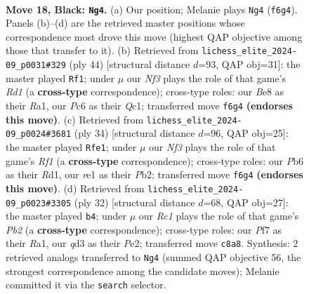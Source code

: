 \documentclass[11pt]{article}
\begin{document}
\clearpage

\begin{figure}[p]\centering
\begin{subfigure}{0.46\textwidth}\centering
\resizebox{\linewidth}{!}{%
\newchessgame
\chessboard[
  setfen={2r1b1k1/p1qr1pp1/npp1pn2/7p/PbNP1P2/1PNQ2P1/4P2P/R1B1RBK1 b - - 7 18},
  showmover=false,
  pgfstyle=straightmove, color=movearrow, markmove={f6-g4}
]}
\caption{}
\end{subfigure}\hfill
\begin{subfigure}{0.46\textwidth}\centering
\resizebox{\linewidth}{!}{%
\newchessgame
\chessboard[
  setfen={2r3k1/1p2q1bp/n1pr1p2/p1n2Pp1/3N4/1P2p1P1/PBP1P1BP/R1QR3K w - - 2 23},
  showmover=false,
  pgfstyle=straightmove, color=movearrow, markmove={d1-f1}
]}
\caption{}
\end{subfigure}
\\[4pt]
\begin{subfigure}{0.46\textwidth}\centering
\resizebox{\linewidth}{!}{%
\newchessgame
\chessboard[
  setfen={r1bqr1k1/1p3ppp/2pp1b2/p3n3/Pn1NPB2/1BN4P/1PP2PPQ/3R1RK1 w - - 10 18},
  showmover=false,
  pgfstyle=straightmove, color=movearrow, markmove={f1-e1}
]}
\caption{}
\end{subfigure}\hfill
\begin{subfigure}{0.46\textwidth}\centering
\resizebox{\linewidth}{!}{%
\newchessgame
\chessboard[
  setfen={r1b1r1k1/1pq2pbp/p2p2p1/2pPn3/P3NB2/6P1/1P1QPPBP/R1R3K1 w - - 4 17},
  showmover=false,
  pgfstyle=straightmove, color=movearrow, markmove={b2-b4}
]}
\caption{}
\end{subfigure}
\caption{\textbf{Move 18, Black: \texttt{Ng4}.} (a) Our position; Melanie plays \texttt{Ng4} (\texttt{f6g4}). Panels (b)--(d) are the retrieved master positions whose correspondence most drove this move (highest QAP objective among those that transfer to it). (b) Retrieved from \texttt{lichess\_elite\_2024-09\_p0031\#329} (ply 44) [structural distance $d$=93, QAP obj=31]: the master played \texttt{Rf1}; under $\mu$ our \emph{Nf3} plays the role of that game's \emph{Rd1} (a \textbf{cross-type} correspondence); cross-type roles: our \emph{B}e8 as their \emph{R}a1, our \emph{P}c6 as their \emph{Q}c1; transferred move \texttt{f6g4} \textbf{(endorses this move)}. (c) Retrieved from \texttt{lichess\_elite\_2024-09\_p0024\#3681} (ply 34) [structural distance $d$=96, QAP obj=25]: the master played \texttt{Rfe1}; under $\mu$ our \emph{Nf3} plays the role of that game's \emph{Rf1} (a \textbf{cross-type} correspondence); cross-type roles: our \emph{P}b6 as their \emph{R}d1, our \emph{r}e1 as their \emph{P}b2; transferred move \texttt{f6g4} \textbf{(endorses this move)}. (d) Retrieved from \texttt{lichess\_elite\_2024-09\_p0023\#3305} (ply 32) [structural distance $d$=68, QAP obj=27]: the master played \texttt{b4}; under $\mu$ our \emph{Rc1} plays the role of that game's \emph{Pb2} (a \textbf{cross-type} correspondence); cross-type roles: our \emph{P}f7 as their \emph{R}a1, our \emph{q}d3 as their \emph{P}e2; transferred move \texttt{c8a8}. Synthesis: 2 retrieved analogs transferred to \texttt{Ng4} (summed QAP objective 56, the strongest correspondence among the candidate moves); Melanie committed it via the \texttt{search} selector.}

\end{figure}
\end{document}
